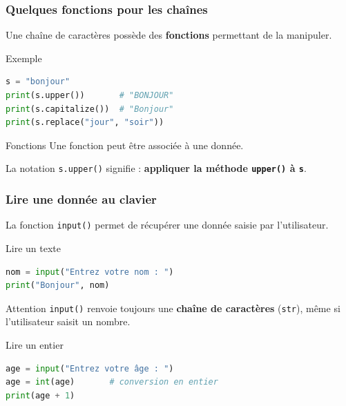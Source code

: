 \documentclass[10pt]{beamer}
\begin{document}
\begin{frame}[containsverbatim]
\frametitle{Quelques fonctions pour les chaînes}

Une chaîne de caractères possède des \textbf{fonctions} permettant de la manipuler.

\begin{exampleblock}{Exemple}
\begin{lstlisting}[language=Python]
s = "bonjour"
print(s.upper())       # "BONJOUR"
print(s.capitalize())  # "Bonjour"
print(s.replace("jour", "soir"))
\end{lstlisting}
\end{exampleblock}

\vspace{0.15cm}

\begin{block}{Fonctions}
Une fonction peut être associée à une donnée.

\vspace{0.1cm}

La notation \texttt{s.upper()} signifie :
\textbf{appliquer la méthode \texttt{upper()} à \texttt{s}}.
\end{block}

\end{frame}


\begin{frame}[containsverbatim]
\frametitle{Lire une donnée au clavier}

La fonction \texttt{input()} permet de récupérer une donnée
saisie par l'utilisateur.

\begin{exampleblock}{Lire un texte}
\begin{lstlisting}[language=Python]
nom = input("Entrez votre nom : ")
print("Bonjour", nom)
\end{lstlisting}
\end{exampleblock}

\vspace{0.15cm}

\begin{alertblock}{Attention}
\texttt{input()} renvoie toujours une \textbf{chaîne de caractères}
(\texttt{str}), même si l'utilisateur saisit un nombre.
\end{alertblock}

\begin{exampleblock}{Lire un entier}
\begin{lstlisting}[language=Python]
age = input("Entrez votre âge : ")
age = int(age)       # conversion en entier
print(age + 1)
\end{lstlisting}
\end{exampleblock}

\end{frame}
\end{document}
